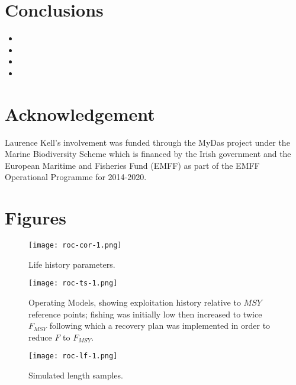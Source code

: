 \documentclass[12pt,doublespacing,a4paper]{ouparticle}
\begin{document}
\section{Conclusions}

\begin{itemize}
 \item 
 \item 
 \item 
 \item 
\end{itemize}

\section{Acknowledgement}

Laurence Kell's involvement was funded through the MyDas project under the Marine Biodiversity Scheme which is financed by the Irish government and the European Maritime and Fisheries Fund (EMFF) as part of the EMFF Operational Programme for 2014-2020. 

\clearpage
%
%


\clearpage
\section{Figures}

\newpage
\begin{figure}[h]
\centering
%
\texttt{[image: roc-cor-1.png]}
\caption{Life history parameters.}
\label{fig:cor}
\end{figure}

\newpage
\begin{figure}[h]
\centering
\texttt{[image: roc-ts-1.png]}
\caption{Operating Models, showing exploitation history relative to $MSY$ reference points; fishing was initially low then increased to twice $F_{MSY}$ following which a recovery plan was implemented in order to reduce $F$ to $F_{MSY}$.}
\label{fig:oms}
\end{figure}



\newpage
\begin{figure}[h]
\centering
\texttt{[image: roc-lf-1.png]}
\caption{Simulated length samples.}
\label{fig:samples}
\end{figure}
\end{document}
